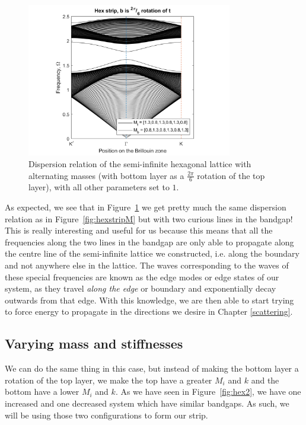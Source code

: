 \begin{figure}[!h]
\centering
\includegraphics[width=0.8\textwidth]{imgs/hexstripperturbMrotated.png}
\caption{\label{fig:hexstripMrotated} Dispersion relation of the semi-infinite
  hexagonal lattice with alternating masses (with bottom layer as a
  $\frac{2\pi}{6}$ rotation of the top layer), with all other parameters set to
  $1$.}
\end{figure}

As expected, we see that in Figure~\ref{fig:hexstripMrotated} we get pretty
much the same dispersion relation as in Figure~\ref{fig:hexstripM} but with two
curious lines in the bandgap! This is really interesting and useful for us
because this means that all the frequencies along the two lines in the bandgap
are only able to propagate along the centre line of the semi-infinite lattice
we constructed, i.e. along the boundary and not anywhere else in the lattice.
The waves corresponding to the waves of these special frequencies are known as
the edge modes or edge states of our system, as they travel \textit{along the
edge} or boundary and exponentially decay outwards from that edge. With this
knowledge, we are then able to start trying to force energy to propagate in the
directions we desire in Chapter \ref{scattering}.

\subsection{Varying mass and stiffnesses}
\label{perturbMk}
We can do the same thing in this case, but instead of making the bottom layer a
rotation of the top layer, we make the top have a greater $M_i$ and $k$ and the
bottom have a lower $M_i$ and $k$. As we have seen in
Figure~\ref{fig:hex2}, we have one increased and one decreased system which
have similar bandgaps. As such, we will be using those two configurations to
form our strip.

